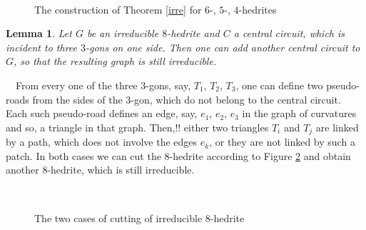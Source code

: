 \documentclass[12pt]{article}
\newtheorem{lemma}{Lemma}
\newcommand{\proof}{\noindent{\bf Proof.}\ \ }
\begin{document}
\begin{figure}
\centering
\mbox{\quad
{}\quad
{}}
\caption{The construction of Theorem \ref{irre} for $6$-, $5$-, $4$-hedrites}
\label{The456hedriteCases}
\end{figure}




\begin{lemma}
Let $G$ be an irreducible $8$-hedrite and $C$ a central circuit,
which is incident to three $3$-gons on one side. Then one can add another central circuit to $G$,  so that the resulting graph is still irreducible.
\end{lemma}
\proof From every one of the three $3$-gons, say, $T_1$, $T_2$, $T_3$, one can define two pseudo-roads from the sides of the $3$-gon, which do not belong to the central circuit.
Each such pseudo-road defines an edge, say, $e_1$, $e_2$, $e_3$ in the graph 
of curvatures and so, a triangle in that graph. Then,!! either two triangles 
$T_i$ and $T_j$ are linked by a path, which does not involve the edges $e_k$,
or they are not linked by such a patch. In both cases we can cut the 
$8$-hedrite according to Figure \ref{TwoCasesCutting} and obtain 
another $8$-hedrite, which is still irreducible.


\begin{figure}
\centering
\mbox{
}
\caption{The two cases of cutting of irreducible $8$-hedrite}
\label{TwoCasesCutting}
\end{figure}





\end{document}
